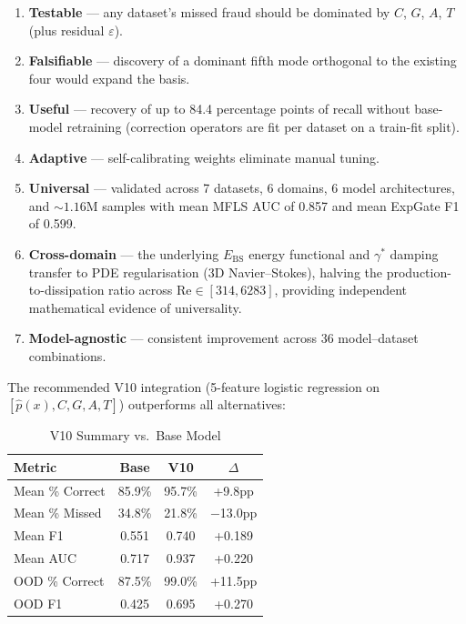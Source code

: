 \documentclass[journal]{IEEEtran}
\begin{document}
\begin{enumerate}
  \item \textbf{Testable} --- any dataset's missed fraud should be dominated by $C$, $G$, $A$, $T$ (plus residual $\varepsilon$).
  \item \textbf{Falsifiable} --- discovery of a dominant fifth mode orthogonal to the existing four would expand the basis.
  \item \textbf{Useful} --- recovery of up to 84.4 percentage points of recall without base-model retraining (correction operators are fit per dataset on a train-fit split).
  \item \textbf{Adaptive} --- self-calibrating weights eliminate manual tuning.
  \item \textbf{Universal} --- validated across 7 datasets, 6 domains, 6 model architectures, and ${\sim}1.16$M samples with mean MFLS AUC of 0.857 and mean ExpGate F1 of 0.599.
  \item \textbf{Cross-domain} --- the underlying $E_{\mathrm{BS}}$ energy functional and $\gamma^*$ damping transfer to PDE regularisation (3D Navier--Stokes), halving the production-to-dissipation ratio across $\mathrm{Re} \in [314, 6283]$, providing independent mathematical evidence of universality.
  \item \textbf{Model-agnostic} --- consistent improvement across 36 model--dataset combinations.
\end{enumerate}

The recommended V10 integration (5-feature logistic regression on $[\hat{p}(x), C, G, A, T]$) outperforms all alternatives:

\begin{table}[!t]
\centering
\caption{V10 Summary vs.\ Base Model}
\label{tab:v10_summary}
\begin{tabular}{@{}lccc@{}}
\toprule
\textbf{Metric} & \textbf{Base} & \textbf{V10} & $\Delta$ \\
\midrule
Mean \% Correct    & 85.9\% & 95.7\% & +9.8pp \\
Mean \% Missed     & 34.8\% & 21.8\% & $-$13.0pp \\
Mean F1            & 0.551  & 0.740  & +0.189 \\
Mean AUC           & 0.717  & 0.937  & +0.220 \\
OOD \% Correct     & 87.5\% & 99.0\% & +11.5pp \\
OOD F1             & 0.425  & 0.695  & +0.270 \\
\bottomrule
\end{tabular}
\end{table}
\end{document}
